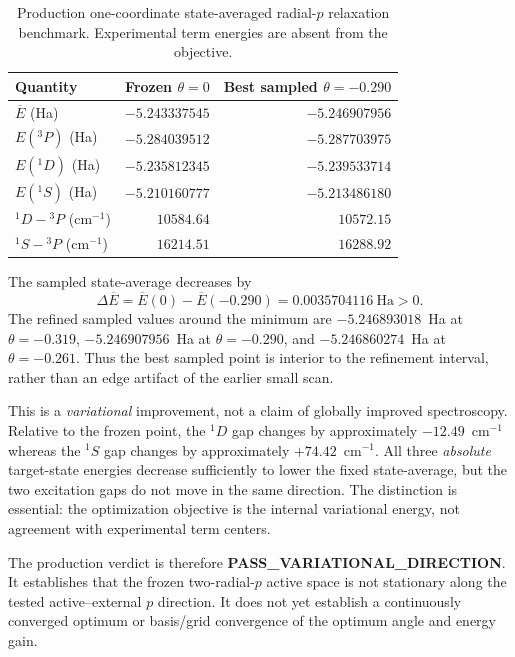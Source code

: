 \begin{table}[ht]
\centering
\small
\begin{tabular}{lrr}
\toprule
Quantity & Frozen $\theta=0$ & Best sampled $\theta=-0.290$ \\
\midrule
$\overline E$ (Ha) & $-5.243337545$ & $-5.246907956$ \\
$E(^3P)$ (Ha) & $-5.284039512$ & $-5.287703975$ \\
$E(^1D)$ (Ha) & $-5.235812345$ & $-5.239533714$ \\
$E(^1S)$ (Ha) & $-5.210160777$ & $-5.213486180$ \\
$^1D-{}^3P$ (cm$^{-1}$) & $10584.64$ & $10572.15$ \\
$^1S-{}^3P$ (cm$^{-1}$) & $16214.51$ & $16288.92$ \\
\bottomrule
\end{tabular}
\caption{Production one-coordinate state-averaged radial-$p$ relaxation benchmark.  Experimental term energies are absent from the objective.}
\label{tab:carbon-state-average-production}
\end{table}

The sampled state-average decreases by
\begin{equation}
\Delta\overline E
=\overline E(0)-\overline E(-0.290)
=0.0035704116\ \mathrm{Ha}>0.
\end{equation}
The refined sampled values around the minimum are $-5.246893018$~Ha at $\theta=-0.319$, $-5.246907956$~Ha at $\theta=-0.290$, and $-5.246860274$~Ha at $\theta=-0.261$.  Thus the best sampled point is interior to the refinement interval, rather than an edge artifact of the earlier small scan.

This is a \emph{variational} improvement, not a claim of globally improved spectroscopy.  Relative to the frozen point, the $^1D$ gap changes by approximately $-12.49$~cm$^{-1}$ whereas the $^1S$ gap changes by approximately $+74.42$~cm$^{-1}$.  All three \emph{absolute} target-state energies decrease sufficiently to lower the fixed state-average, but the two excitation gaps do not move in the same direction.  The distinction is essential: the optimization objective is the internal variational energy, not agreement with experimental term centers.

The production verdict is therefore \textbf{PASS\_VARIATIONAL\_DIRECTION}.  It establishes that the frozen two-radial-$p$ active space is not stationary along the tested active--external $p$ direction.  It does not yet establish a continuously converged optimum or basis/grid convergence of the optimum angle and energy gain.

